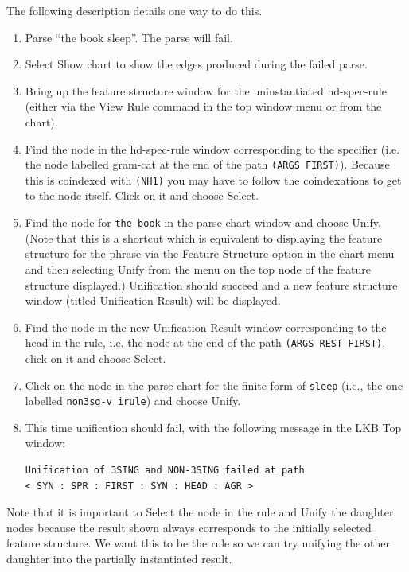 \documentclass[12pt]{report}
\newcommand{\lkbentryname}[1]{{\tt #1}}
\newcommand{\lkbmenucommand}{{\bf}}
\begin{document}
The following description details one way to do this.
\begin{enumerate}
\item Parse ``the book sleep''.  The parse will fail.
\item Select {\lkbmenucommand Show chart} to show the edges produced
during the failed parse.
\item Bring up the feature structure window for 
the uninstantiated hd-spec-rule 
(either via the {\lkbmenucommand View Rule} command in the top window menu
or from the chart).
\item Find the node in the hd-spec-rule window corresponding
to the specifier (i.e. the node labelled {\type gram-cat} at
the end of the path {\tt (ARGS FIRST)}).  Because this is
coindexed with {\tt (NH1)} you may have to follow the coindexations
to get to the node itself.
Click on it and choose {\lkbmenucommand Select}.
\item Find the
node for {\tt the book} in the parse chart window
and choose {\lkbmenucommand Unify}.
(Note that this is a shortcut which is equivalent to displaying the 
feature structure for the
phrase via the {\lkbmenucommand Feature Structure} option in the 
chart menu and then selecting {\lkbmenucommand Unify} from the menu on 
the top node of the feature structure displayed.)
Unification should succeed and a new feature structure
window (titled Unification Result) will be displayed.  
\item Find the node in the new Unification Result window corresponding
to the head in the rule, i.e. the node at
the end of the path {\tt (ARGS REST FIRST)}, click on it and choose {\lkbmenucommand Select}.
\item Click on the
node in the parse chart for the finite form of
{\tt sleep} (i.e., the one labelled
\lkbentryname{non3sg-v\_irule}) and choose {\lkbmenucommand Unify}.
\item This time unification should fail, with the following message
in the LKB Top window:
\begin{verbatim}
Unification of 3SING and NON-3SING failed at path 
< SYN : SPR : FIRST : SYN : HEAD : AGR >
\end{verbatim}
\end{enumerate}

Note that it is important to 
{\lkbmenucommand Select} the node in the rule and {\lkbmenucommand Unify} the daughter nodes
because the result shown always corresponds to the 
initially selected feature structure.  
We want this to be the rule so we can try
unifying the other daughter into the partially instantiated result.
\end{document}

